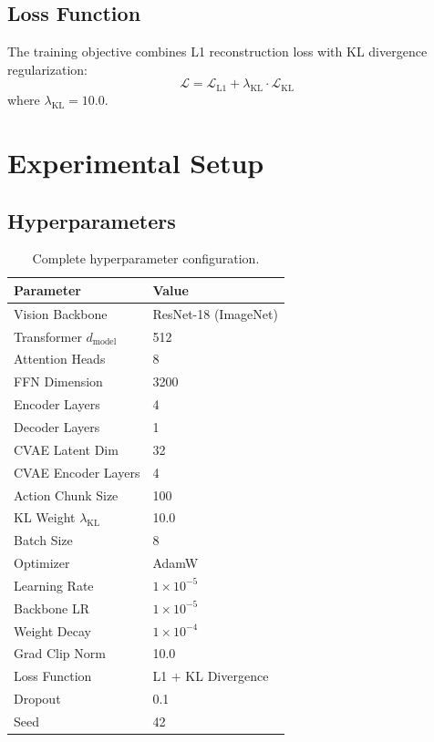 \documentclass[10pt,twocolumn]{article}
\begin{document}
\subsection{Loss Function}

The training objective combines L1 reconstruction loss with KL divergence regularization:
\begin{equation}
    \mathcal{L} = \mathcal{L}_{\text{L1}} + \lambda_{\text{KL}} \cdot \mathcal{L}_{\text{KL}}
\end{equation}
where $\lambda_{\text{KL}} = 10.0$.

\section{Experimental Setup}

\subsection{Hyperparameters}

\begin{table}[H]
\centering
\caption{Complete hyperparameter configuration.}
\label{tab:hyperparams}
\begin{tabular}{ll}
\toprule
\textbf{Parameter} & \textbf{Value} \\
\midrule
Vision Backbone & ResNet-18 (ImageNet) \\
Transformer $d_{\text{model}}$ & 512 \\
Attention Heads & 8 \\
FFN Dimension & 3200 \\
Encoder Layers & 4 \\
Decoder Layers & 1 \\
CVAE Latent Dim & 32 \\
CVAE Encoder Layers & 4 \\
Action Chunk Size & 100 \\
KL Weight $\lambda_{\text{KL}}$ & 10.0 \\
Batch Size & 8 \\
Optimizer & AdamW \\
Learning Rate & $1 \times 10^{-5}$ \\
Backbone LR & $1 \times 10^{-5}$ \\
Weight Decay & $1 \times 10^{-4}$ \\
Grad Clip Norm & 10.0 \\
Loss Function & L1 + KL Divergence \\
Dropout & 0.1 \\
Seed & 42 \\
\bottomrule
\end{tabular}
\end{table}
\end{document}
